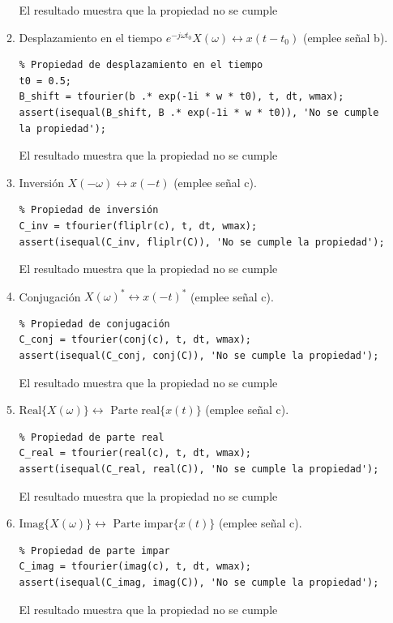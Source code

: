 \documentclass{article}
\begin{document}
\begin{enumerate}[leftmargin=*]
\begin{enumerate}[label=\roman*)]
El resultado muestra que la propiedad no se cumple
\item Desplazamiento en el tiempo $e^{-j\omega t_0}X(\omega)\longleftrightarrow x(t-t_0)$ (emplee señal b).
\begin{lstlisting}
% Propiedad de desplazamiento en el tiempo
t0 = 0.5;
B_shift = tfourier(b .* exp(-1i * w * t0), t, dt, wmax);
assert(isequal(B_shift, B .* exp(-1i * w * t0)), 'No se cumple la propiedad');
\end{lstlisting}
El resultado muestra que la propiedad no se cumple
\item Inversión $X(-\omega)\longleftrightarrow x(-t)$ (emplee señal c).
\begin{lstlisting}
% Propiedad de inversión
C_inv = tfourier(fliplr(c), t, dt, wmax);
assert(isequal(C_inv, fliplr(C)), 'No se cumple la propiedad');
\end{lstlisting}
El resultado muestra que la propiedad no se cumple
\item Conjugación $X(\omega)^*\longleftrightarrow x(-t)^*$ (emplee señal c).

\begin{lstlisting}
% Propiedad de conjugación
C_conj = tfourier(conj(c), t, dt, wmax);
assert(isequal(C_conj, conj(C)), 'No se cumple la propiedad');
\end{lstlisting}
El resultado muestra que la propiedad no se cumple
\item $\mathrm{Real}\{X(\omega)\}\longleftrightarrow\text{ Parte real}\{x(t)\}$ (emplee señal c).

\begin{lstlisting}
% Propiedad de parte real
C_real = tfourier(real(c), t, dt, wmax);
assert(isequal(C_real, real(C)), 'No se cumple la propiedad');
\end{lstlisting}
El resultado muestra que la propiedad no se cumple
\item $\mathrm{Imag}\{X(\omega)\}\longleftrightarrow\text{ Parte impar}\{x(t)\}$ (emplee señal c).

\begin{lstlisting}
% Propiedad de parte impar
C_imag = tfourier(imag(c), t, dt, wmax);
assert(isequal(C_imag, imag(C)), 'No se cumple la propiedad');
\end{lstlisting}
El resultado muestra que la propiedad no se cumple
\end{enumerate}
\end{enumerate}
\end{document}
